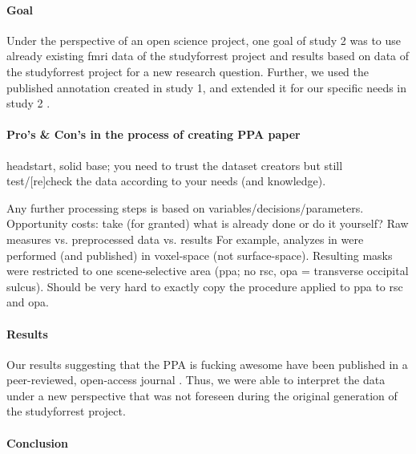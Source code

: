 \paragraph{Goal}
Under the perspective of an open science project, one goal of study 2 was to use
already existing \ac{fmri} data \citep{hanke2014audiomovie,
hanke2016simultaneous, sengupta2016extension} of the studyforrest project and
results based on data of the studyforrest \citep{sengupta2016extension} project
for a new research question.
%
Further, we used the published annotation created in study 1, and extended it
for our specific needs in study 2 \citep[cf.][]{haeusler2022processing}.
%

\paragraph{Pro's \& Con's in the process of creating PPA paper}

%
headstart, solid base;
%
you need to trust the dataset creators but still test/[re]check the data
according to your needs (and knowledge).

%
Any further processing steps is based on variables/decisions/parameters.
%
Opportunity costs: take (for granted) what is already done or do it yourself?
%
Raw measures vs. preprocessed data vs. results
%
For example, analyzes in \citet{sengupta2016extension} were performed (and
published) in voxel-space (not surface-space).
%
Resulting masks were restricted to one scene-selective area (\ac{ppa}; no
\ac{rsc}, \ac{opa} = transverse occipital sulcus).
%
Should be very hard to exactly copy the procedure applied to \ac{ppa} to
\ac{rsc} and \ac{opa}.


\paragraph{Results}
Our results suggesting that the PPA is fucking awesome have been published in a
peer-reviewed, open-access journal \citep{haeusler2022processing}.
Thus, we were able to interpret the data under a new perspective that was not
foreseen during the original generation of the studyforrest project.


\paragraph{Conclusion}


